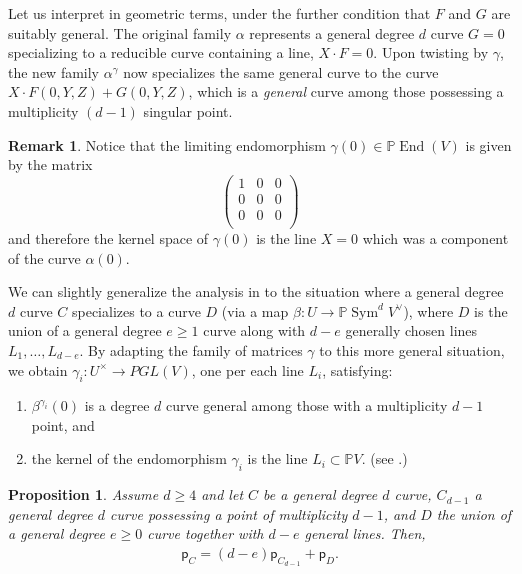 \documentclass[12 pt, reqno]{amsart}
\newtheorem{prop}[thm]{Proposition}
\theoremstyle{definition}
\newtheorem{rmk}[thm]{Remark}
\newcommand{\on}{\operatorname}
\newcommand{\mb}{\mathbb}
\renewcommand{\P}{\mb{P}}
\newcommand{\p}{\mathsf{p}}
\begin{document}
Let us interpret  in geometric terms, under the further
condition that $F$ and $G$ are suitably general.  The original family
$\alpha$ represents a general degree $d$ curve $G = 0$ specializing to
a reducible curve containing a line, $X \cdot F = 0$.  Upon twisting
by $\gamma$, the new family $\alpha^{\gamma}$ now specializes the same
general curve to the curve $X \cdot F(0,Y,Z) + G(0,Y,Z)$, which is a
{\sl general} curve among those possessing a multiplicity $(d-1)$
singular point.

\begin{rmk}
  \label{rmk:split}
  Notice that the limiting endomorphism $\gamma(0) \in \P \on{End}(V)$
  is given by the matrix
\[\begin{pmatrix}
    1 & 0 & 0 \\
    0 & 0 & 0\\
    0 & 0 & 0\\
  \end{pmatrix}\] and therefore the kernel space of $\gamma(0)$ is the
line $X=0$ which was a component of the curve $\alpha(0)$.
\end{rmk}

We can slightly generalize the analysis in  to the
situation where a general degree $d$ curve $C$ specializes to a curve
$D$ (via a map $\beta: U \to \P \on{Sym}^{d}V^{\vee}$), where $D$ is
the union of a general degree $e \geq 1$ curve along with $d-e$
generally chosen lines $L_1, \dots, L_{d-e}$.  By adapting the family
of matrices $\gamma$ to this more general situation, we obtain
$\gamma_{i}: U^{\times} \to PGL(V)$, one per each line $L_{i}$,
satisfying:
\begin{enumerate}
\item $\beta^{\gamma_{i}}(0)$ is a degree $d$ curve general among
  those with a multiplicity $d-1$ point, and
\item the kernel of the endomorphism $\gamma_{i}$ is the line
  $L_{i} \subset \P V$. (see .)
\end{enumerate}

\begin{prop}
\label{linespecialization}
Assume $d\geq 4$ and let $C$ be a general degree $d$ curve, $C_{d-1}$
a general degree $d$ curve possessing a point of multiplicity $d-1$,
and $D$ the union of a general degree $e \geq 0$ curve together with
$d-e$ general lines. Then,
\begin{align*}
  \p_{C} =  (d-e)\p_{C_{d-1}}+ \p_{D}.
\end{align*}
\end{prop}
\end{document}
